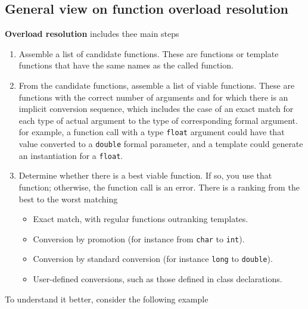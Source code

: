 \documentclass[../main]{subfiles}
\begin{document}
\subsection{General view on function overload resolution}
    \textbf{Overload resolution} includes thee main steps
\begin{enumerate}
    \item Assemble a list of candidate functions. These are functions or template functions that have the same names as the called function.
    \item From the candidate functions, assemble a list of viable functions. These are functions with the correct number of arguments and for which there is an implicit
    conversion sequence, which includes the case of an exact match for each type of actual argument to the type of corresponding formal argument. for example, a function call
    with a type \texttt{float} argument could have that value converted to a \texttt{double} formal parameter, and a template could generate an instantiation for a \texttt{float}.
    \item Determine whether there is a best viable function. If so, you use that function;
    otherwise, the function call is an error. There is a ranking from the best to the worst matching
    \begin{itemize}
        \item Exact match, with regular functions outranking templates.
        \item Conversion by promotion (for instance from \texttt{char} to \texttt{int}).
        \item Conversion by standard conversion (for instance \texttt{long} to \texttt{double}).
        \item User-defined conversions, such as those defined in class declarations.
    \end{itemize}
\end{enumerate}

\noindent
To understand it better, consider the following example
\end{document}
